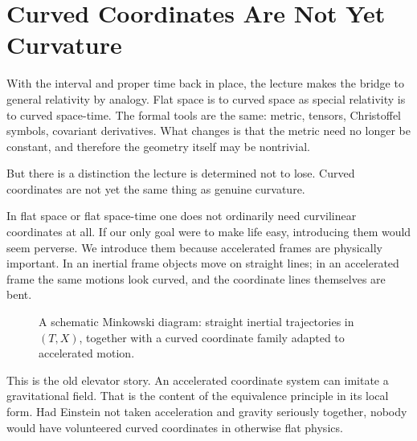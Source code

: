 \section{Curved Coordinates Are Not Yet Curvature}

With the interval and proper time back in place, the lecture makes the bridge to general relativity by analogy. Flat space is to curved space as special relativity is to curved space-time. The formal tools are the same: metric, tensors, Christoffel symbols, covariant derivatives. What changes is that the metric need no longer be constant, and therefore the geometry itself may be nontrivial.

But there is a distinction the lecture is determined not to lose. Curved coordinates are not yet the same thing as genuine curvature.

In flat space or flat space-time one does not ordinarily need curvilinear coordinates at all. If our only goal were to make life easy, introducing them would seem perverse. We introduce them because accelerated frames are physically important. In an inertial frame objects move on straight lines; in an accelerated frame the same motions look curved, and the coordinate lines themselves are bent.

\begin{figure}[h]
\centering
{}
\caption{A schematic Minkowski diagram: straight inertial trajectories in \((T,X)\), together with a curved coordinate family adapted to accelerated motion.}
\end{figure}

This is the old elevator story. An accelerated coordinate system can imitate a gravitational field. That is the content of the equivalence principle in its local form. Had Einstein not taken acceleration and gravity seriously together, nobody would have volunteered curved coordinates in otherwise flat physics.

